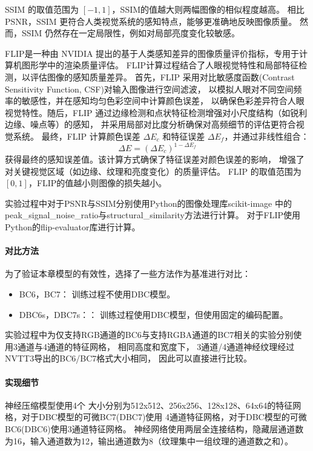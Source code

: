 SSIM 的取值范围为 $[-1,1]$，SSIM的值越大则两幅图像的相似程度越高。
相比PSNR，SSIM 更符合人类视觉系统的感知特点，能够更准确地反映图像质量。
然而，SSIM 仍然存在一定局限性，例如对局部亮度变化较敏感。

FLIP\cite{andersson2020flip}是一种由 NVIDIA 提出的基于人类感知差异的图像质量评价指标，专用于计算机图形学中的渲染质量评估。
FLIP计算过程结合了人眼视觉特性和局部特征检测，以评估图像的感知质量差异。
首先，FLIP 采用对比敏感度函数(Contrast Sensitivity Function, CSF)对输入图像进行空间滤波，
以模拟人眼对不同空间频率的敏感性，并在感知均匀色彩空间中计算颜色误差，
以确保色彩差异符合人眼视觉特性。随后，FLIP 通过边缘检测和点状特征检测增强对小尺度结构（如锐利边缘、噪点等）的感知，
并采用局部对比度分析确保对高频细节的评估更符合视觉系统。
最终，FLIP 计算颜色误差 $\Delta E_c$ 和特征误差 $\Delta E_f$，并通过非线性组合：
\begin{equation}
    \Delta E = (\Delta E_c)^{1 - \Delta E_f}
\end{equation}
获得最终的感知误差值。该计算方式确保了特征误差对颜色误差的影响，
增强了对关键视觉区域（如边缘、纹理和亮度变化）的质量评估。
FLIP 的取值范围为 $[0,1]$，FLIP的值越小则图像的损失越小。

实验过程中对于PSNR与SSIM分别使用Python的图像处理库scikit-image\cite{scikit-image}
中的peak\_signal\_noise\_ratio与structural\_similarity方法进行计算。
对于FLIP使用Python的flip-evaluator库进行计算。

\paragraph{对比方法}

为了验证本章模型的有效性，选择了一些方法作为基准进行对比：

\begin{itemize}
\item BC6，BC7： 训练过程不使用DBC模型。
\item DBC6s，DBC7s：： 训练过程使用DBC模型，但使用固定的编码配置。
\end{itemize}

实验过程中为仅支持RGB通道的BC6与支持RGBA通道的BC7相关的实验分别使用3通道与4通道的特征网格，
相同高度和宽度下，
3通道/4通道神经纹理经过NVTT3导出的BC6/BC7格式大小相同，
因此可以直接进行比较。

\paragraph{实现细节}

神经压缩模型使用4个
大小分别为512x512、256x256、128x128、64x64的特征网格，对于DBC模型的可微BC7(DBC7)使用
4通道特征网格，对于DBC模型的可微BC6(DBC6)使用3通道特征网格。
神经网络使用两层全连接结构，隐藏层通道数为16，输入通道数为12，输出通道数为8（纹理集中一组纹理的通道数之和）。

